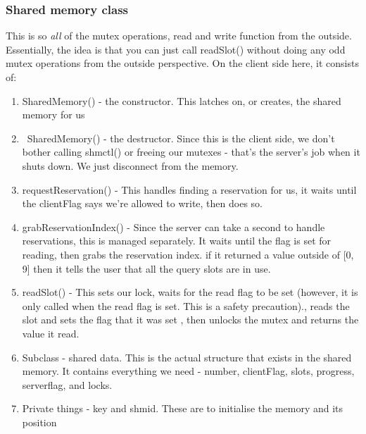 \documentclass{article}
\begin{document}
    \subsubsection*{Shared memory class}
    This is so \textit{all} of the mutex operations, read and write function
    from the outside.
    Essentially, the idea is that you can just call readSlot() without doing
    any odd mutex operations from the outside perspective.
    On the client side here, it consists of:
    \begin{enumerate}
        \item SharedMemory() - the constructor.
        This latches on, or creates, the shared memory for us
        \item ~SharedMemory() - the destructor.
        Since this is the client side, we don't bother calling shmctl() or freeing
        our mutexes - that's the server's job when it shuts down.
        We just disconnect from the memory.
        \item requestReservation() - This handles finding a reservation for us,
        it waits until the clientFlag says we're allowed to write, then does so.
        \item grabReservationIndex() - Since the server can take a second
        to handle reservations, this is managed separately.
        It waits until the flag is set for reading, then grabs the reservation index.
        if it returned a value outside of [0, 9] then it tells the user that
        all the query slots are in use.
        \item readSlot() - This sets our lock, waits for the read flag to be set
        (however, it is only called when the read flag is set.
        This is a safety precaution)., reads the slot and sets the flag that it was set
        , then unlocks the mutex and returns the value it read.
        \item Subclass - shared data.
        This is the actual structure that exists in the shared memory. It
        contains everything we need - number, clientFlag, slots, progress,
        serverflag, and locks.
        \item Private things - key and shmid.
        These are to initialise the memory and its position
    \end{enumerate}
\end{document}
